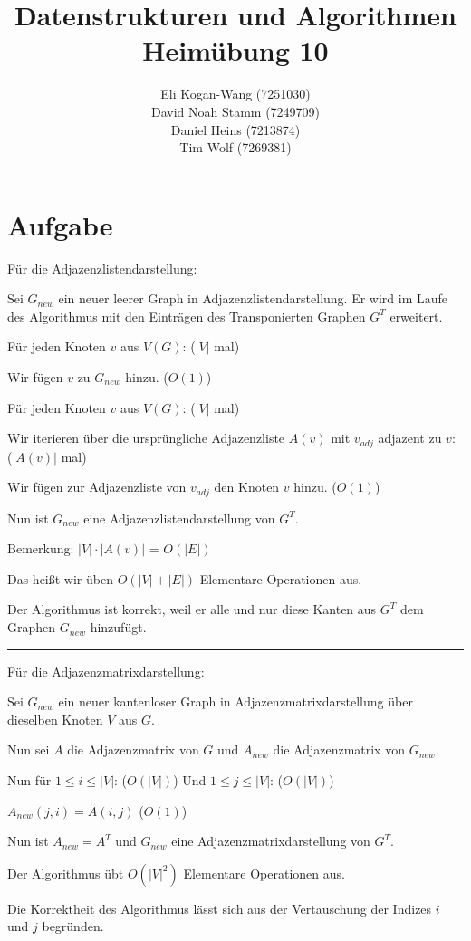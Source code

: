 \documentclass{article}
\newcommand{\zettelNummer}{10}
\newcommand{\studierenderEins}{Eli Kogan-Wang (7251030)}
\newcommand{\studierenderZwei}{David Noah Stamm (7249709)}
\newcommand{\studierenderDrei}{Daniel Heins (7213874)}
\newcommand{\studierenderVier}{Tim Wolf (7269381)}
\newcounter{AufgabenCounter}
\newcounter{TeilaufgabenCounter}
\newenvironment{aufgabe}{\section*{Aufgabe \theAufgabenCounter}\setcounter{TeilaufgabenCounter}{1}}{\stepcounter{AufgabenCounter}}
\begin{document}
\title{Datenstrukturen und Algorithmen \\ Heimübung \zettelNummer{}}
\author{\studierenderEins{} \\
  \studierenderZwei{} \\
  \studierenderDrei{} \\
  \studierenderVier{}}

\maketitle

\begin{aufgabe}
  Für die Adjazenzlistendarstellung:

  Sei $G_{new}$ ein neuer leerer Graph in Adjazenzlistendarstellung. Er wird im Laufe des Algorithmus
  mit den Einträgen des Transponierten Graphen $G^T$ erweitert.

  Für jeden Knoten $v$ aus $V(G)$: ($|V|$ mal)

  Wir fügen $v$ zu $G_{new}$ hinzu. ($O(1)$)

  Für jeden Knoten $v$ aus $V(G)$: ($|V|$ mal)

  Wir iterieren über die ursprüngliche Adjazenzliste
  $A(v)$ mit $v_{adj}$ adjazent zu $v$: ($|A(v)|$ mal)

  Wir fügen zur Adjazenzliste von $v_{adj}$ den Knoten $v$ hinzu. ($O(1)$)

  Nun ist $G_{new}$ eine Adjazenzlistendarstellung von $G^T$.

  Bemerkung: $|V|\cdot|A(v)|$ = $O(|E|)$

  Das heißt wir üben $O(|V|+|E|)$ Elementare Operationen aus.

  Der Algorithmus ist korrekt, weil er alle und nur diese Kanten aus $G^T$ dem
  Graphen $G_{new}$ hinzufügt.

  \rule{\textwidth}{0.5pt}

  Für die Adjazenzmatrixdarstellung:

  Sei $G_{new}$ ein neuer kantenloser Graph in Adjazenzmatrixdarstellung
  über dieselben Knoten $V$ aus $G$.

  Nun sei $A$ die Adjazenzmatrix von $G$ und $A_{new}$ die Adjazenzmatrix von $G_{new}$.

  Nun für $1\leq i\leq |V|$: ($O(|V|)$) Und $1\leq j\leq |V|$: ($O(|V|)$)

  $A_{new}(j,i) = A(i,j)$ ($O(1)$)

  Nun ist $A_{new}=A^T$ und $G_{new}$ eine Adjazenzmatrixdarstellung von $G^T$.

  Der Algorithmus übt $O(|V|^2)$ Elementare Operationen aus.

  Die Korrektheit des Algorithmus lässt sich aus der Vertauschung der Indizes $i$ und $j$
  begründen.
\end{aufgabe}
\end{document}
